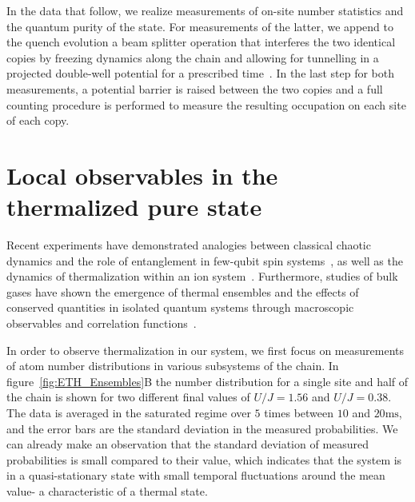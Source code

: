 In the data that follow, we realize measurements of on-site number statistics and the quantum purity of the state. For measurements of the latter, we append to the quench evolution a beam splitter operation that interferes the two identical copies by freezing dynamics along the chain and allowing for tunnelling in a projected double-well potential for a prescribed time~\cite{Islam2015}. In the last step for both measurements, a potential barrier is raised between the two copies and a full counting procedure is performed to measure the resulting occupation on each site of each copy.

\section{Local observables in the thermalized pure state}
Recent experiments have demonstrated analogies between classical chaotic dynamics and the role of entanglement in few-qubit spin systems~\cite{Neill2016}, as well as the dynamics of thermalization within an ion system~\cite{Clos2016}. Furthermore, studies of bulk gases have shown the emergence of thermal ensembles and the effects of conserved quantities in isolated quantum systems through macroscopic observables and correlation functions~\cite{Trotzky2012,Langen2013,Geiger2014,Langen2015}.

In order to observe thermalization in our system, we first focus on measurements of atom number distributions in various subsystems of the chain. In figure~\ref{fig:ETH_Ensembles}B the number distribution for a single site and half of the chain is shown for two different final values of $U/J = 1.56$ and $U/J =0.38$. The data is averaged in the saturated regime over $5$ times between $10$ and $20\mathrm{ms}$, and the error bars are the standard deviation in the measured probabilities. We can already make an observation that the standard deviation of measured probabilities is small compared to their value, which indicates that the system is in a quasi-stationary state with small temporal fluctuations around the mean value- a characteristic of a thermal state.


